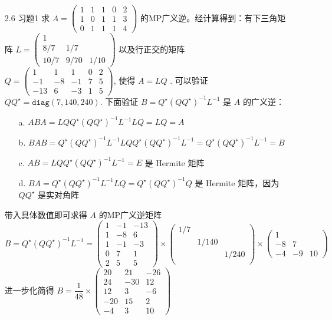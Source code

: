 \documentclass{article}
\begin{document}
\begin{spacing}{1.5}
\begin{enumerate}
        \item [2.6 习题1] 求 $A=\left(\begin{array}{ccccc}1&1&1&0&2\\1&0&1&1&3\\0&1&1&1&4\end{array}\right)$ 的MP广义逆。经计算得到：有下三角矩阵 $L = \left(\begin{array}{ccc}1&&\\8/7&1/7&\\10/7&9/70&1/10\end{array}\right)$ 以及行正交的矩阵 
        $Q = \left(\begin{array}{ccccc}1&1&1&0&2\\-1&-8&-1&7&5\\-13&6&-3&1&5\end{array}\right)$, 使得 $A=L Q$ . 可以验证 $QQ^\star = \mathtt{diag}(7, 140, 240)$. 下面验证 $B = Q^\star (QQ^\star)^{-1} L^{-1}$ 是 $A$ 的广义逆：
        \begin{enumerate}
            \item [a.] $ABA = LQ Q^\star (QQ^\star)^{-1} L^{-1} LQ = LQ = A$
            \item [b.] $BAB = Q^\star (QQ^\star)^{-1} L^{-1} LQ Q^\star (QQ^\star)^{-1} L^{-1} = Q^\star (QQ^\star)^{-1} L^{-1} = B$
            \item [c.] $AB = LQ Q^\star (QQ^\star)^{-1} L^{-1} = E$ 是 Hermite 矩阵
            \item [d.] $BA = Q^\star (QQ^\star)^{-1} L^{-1} LQ = Q^\star (QQ^\star)^{-1} Q$ 是 Hermite 矩阵，因为 $QQ^\star$ 是实对角阵
        \end{enumerate}
        带入具体数值即可求得 $A$ 的MP广义逆矩阵 
        $$B = Q^\star (QQ^\star)^{-1} L^{-1} = \left(\begin{array}{ccc}1&-1&-13\\1&-8&6\\1&-1&-3\\0&7&1\\2&5&5\end{array}\right)\times\left(
            \begin{array}{ccc}1/7&&\\&1/140&\\&&1/240\\\end{array}
        \right)\times\left(\begin{array}{ccc}1&&\\-8&7&\\-4&-9&10\end{array}\right)$$
        进一步化简得 $B = \dfrac{1}{48}\times\left(\begin{array}{ccc}20&21&-26\\24&-30&12\\12&3&-6\\-20&15&2\\-4&3&10\end{array}\right)$
    \end{enumerate}
    
\end{spacing}
\end{document}
